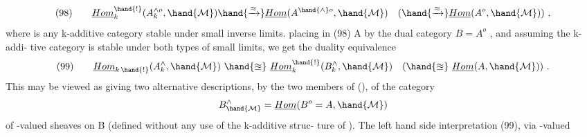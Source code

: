 \[ (98) \qquad \underline{Hom}_{k}^{\hand{!}}(A^{\wedge o}_{k} , \hand{\mathcal{M}}) \hand{\xrightarrow{\approx}} \underline{Hom}(A^{\hand{\wedge}o} , \hand{\mathcal{M}}) \quad ( \hand{\xrightarrow{\approx}} \underline{Hom}(A^{o} , \hand{\mathcal{M}}) ) \ , \]
where  is any k-additive category stable under small inverse limits.
 placing in (98)  A by the dual category $B=A^{o}$ ,  and  assuming the k-addi-%
tive category  is stable under both types of small limits,  we get the
duality equivalence
\[ (99) \qquad \underline{Hom}_{k\,\hand{!}}(A^{\wedge}_{k} , \hand{\mathcal{M}}) \ \hand{\approxeq}\ \underline{Hom}_{k}^{\hand{!}}(B^{\wedge}_{k} , \hand{\mathcal{M}}) \quad ( \hand{\approxeq}\ \underline{Hom}(A, \hand{\mathcal{M}}) ) \ . \]
This may be viewed as giving two alternative descriptions,  by the two
members of (), of the category 
\[ B^{\wedge}_{\hand{\mathcal{M}}} = \underline{Hom}(B^{o}=A , \hand{\mathcal{M}}) \]
of -valued sheaves on B (defined without any use of the k-additive struc-%
ture of ).  The left hand side interpretation (99),  via -valued

